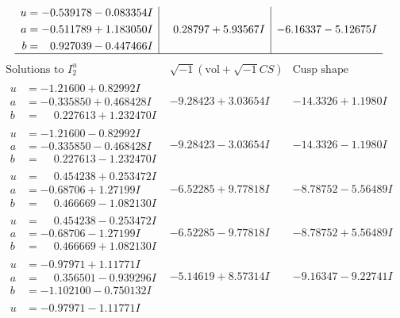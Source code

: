 \documentclass[1p]{elsarticle_modified}
\theoremstyle{definition}
\newcommand{\I}{\sqrt{-1}}
\begin{document}
$$\begin{array}{c|c|c}
\begin{aligned}
u &= -0.539178 - 0.083354 I \\
a &= -0.511789 + 1.183050 I \\
b &= \phantom{-}0.927039 - 0.447466 I\end{aligned}
 & \phantom{-}0.28797 + 5.93567 I & -6.16337 - 5.12675 I\\
 \hline 
 \end{array}$$\newpage$$\begin{array}{c|c|c}  
\text{Solutions to }I^u_{2}& \I (\text{vol} + \sqrt{-1}CS) & \text{Cusp shape}\\
 \hline 
\begin{aligned}
u &= -1.21600 + 0.82992 I \\
a &= -0.335850 + 0.468428 I \\
b &= \phantom{-}0.227613 + 1.232470 I\end{aligned}
 & -9.28423 + 3.03654 I & -14.3326 + 1.1980 I \\ \hline\begin{aligned}
u &= -1.21600 - 0.82992 I \\
a &= -0.335850 - 0.468428 I \\
b &= \phantom{-}0.227613 - 1.232470 I\end{aligned}
 & -9.28423 - 3.03654 I & -14.3326 - 1.1980 I \\ \hline\begin{aligned}
u &= \phantom{-}0.454238 + 0.253472 I \\
a &= -0.68706 + 1.27199 I \\
b &= \phantom{-}0.466669 - 1.082130 I\end{aligned}
 & -6.52285 + 9.77818 I & -8.78752 - 5.56489 I \\ \hline\begin{aligned}
u &= \phantom{-}0.454238 - 0.253472 I \\
a &= -0.68706 - 1.27199 I \\
b &= \phantom{-}0.466669 + 1.082130 I\end{aligned}
 & -6.52285 - 9.77818 I & -8.78752 + 5.56489 I \\ \hline\begin{aligned}
u &= -0.97971 + 1.11771 I \\
a &= \phantom{-}0.356501 - 0.939296 I \\
b &= -1.102100 - 0.750132 I\end{aligned}
 & -5.14619 + 8.57314 I & -9.16347 - 9.22741 I \\ \hline\begin{aligned}
u &= -0.97971 - 1.11771 I \\

\end{aligned}
\end{array}$$
\end{document}
